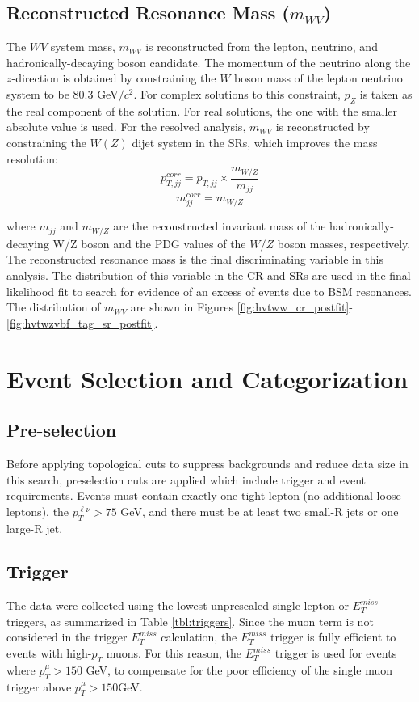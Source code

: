 \section{Reconstructed Resonance Mass ($m_{WV}$)}
The $WV$ system mass, $m_{WV}$ is reconstructed from the lepton, neutrino, and hadronically-decaying boson candidate. The momentum of the neutrino along the $z$-direction is obtained by constraining the $W$ boson mass of the lepton neutrino system to be  80.3 GeV$/c^{2}$. For complex solutions to this constraint, $p_{Z}$ is taken as the real component of the solution. For real solutions, the one with the smaller absolute value is used. For the resolved analysis, $m_{WV}$ is reconstructed by constraining the $W(Z)$ dijet system in the SRs, which improves the mass resolution:
\begin{equation}
p^{corr}_{T,jj} = p_{T,jj} \times \frac{m_{W/Z}}{m_{jj}}
\end{equation}
\begin{equation}
m^{corr}_{jj}=m_{W/Z}
\end{equation}

where $m_{jj}$ and $m_{W/Z}$ are the reconstructed invariant mass of the hadronically-decaying W/Z boson and the PDG values of the $W/Z$ boson masses, respectively. The reconstructed resonance mass is the final discriminating variable in this analysis. The distribution of this variable in the CR and SRs are used in the final likelihood fit to search for evidence of an excess of events due to BSM resonances. The distribution of $m_{WV}$ are shown in Figures \ref{fig:hvtww_cr_postfit}-\ref{fig:hvtwzvbf_tag_sr_postfit}. 
\chapter{Event Selection and Categorization}

\section{Pre-selection}
Before applying topological cuts to suppress backgrounds and reduce data size in this search, preselection cuts are applied which include trigger and event requirements. Events must contain exactly one tight lepton (no additional loose leptons),  the $p_{T}^{\ell \nu} > 75$ GeV, and there must be at least two small-R jets or one large-R jet.
\section{Trigger}
The data were collected using the lowest unprescaled single-lepton or $E_{T}^{miss}$ triggers, as summarized in Table \ref{tbl:triggers}. Since the muon term is not considered in the trigger $E_{T}^{miss}$ calculation, the $E_{T}^{miss}$ trigger is fully efficient to events with high-$p_{T}$ muons. For this reason, the $E_{T}^{miss}$  trigger is used for events where $p_{T}^{\mu} > 150$ GeV, to compensate for the poor efficiency of the single muon trigger above $p_{T}^{\mu}>150$GeV. 


